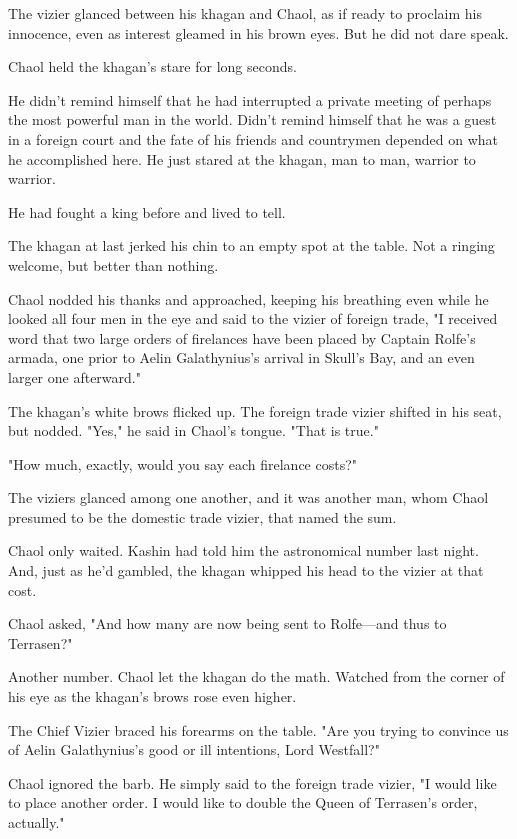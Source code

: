 The vizier glanced between his khagan and Chaol, as if ready to proclaim his innocence, even as interest gleamed in his brown eyes.
But he did not dare speak.

Chaol held the khagan's stare for long seconds.

He didn't remind himself that he had interrupted a private meeting of perhaps the most powerful man in the world.
Didn't remind himself that he was a guest in a foreign court and the fate of his friends and countrymen depended on what he accomplished here.
He just stared at the khagan, man to man, warrior to warrior.

He had fought a king before and lived to tell.

The khagan at last jerked his chin to an empty spot at the table.
Not a ringing welcome, but better than nothing.

Chaol nodded his thanks and approached, keeping his breathing even while he looked all four men in the eye and said to the vizier of foreign trade, "I received word that two large orders of firelances have been placed by Captain Rolfe's armada, one prior to Aelin Galathynius's arrival in Skull's Bay, and an even larger one afterward."

The khagan's white brows flicked up.
The foreign trade vizier shifted in his seat, but nodded.
"Yes," he said in Chaol's tongue.
"That is true."

"How much, exactly, would you say each firelance costs?"

The viziers glanced among one another, and it was another man, whom Chaol presumed to be the domestic trade vizier, that named the sum.

Chaol only waited.
Kashin had told him the astronomical number last night.
And, just as he'd gambled, the khagan whipped his head to the vizier at that cost.

Chaol asked, "And how many are now being sent to Rolfe---and thus to Terrasen?"

Another number.
Chaol let the khagan do the math.
Watched from the corner of his eye as the khagan's brows rose even higher.

The Chief Vizier braced his forearms on the table.
"Are you trying to convince us of Aelin Galathynius's good or ill intentions, Lord Westfall?"

Chaol ignored the barb.
He simply said to the foreign trade vizier, "I would like to place another order.
I would like to double the Queen of Terrasen's order, actually."

